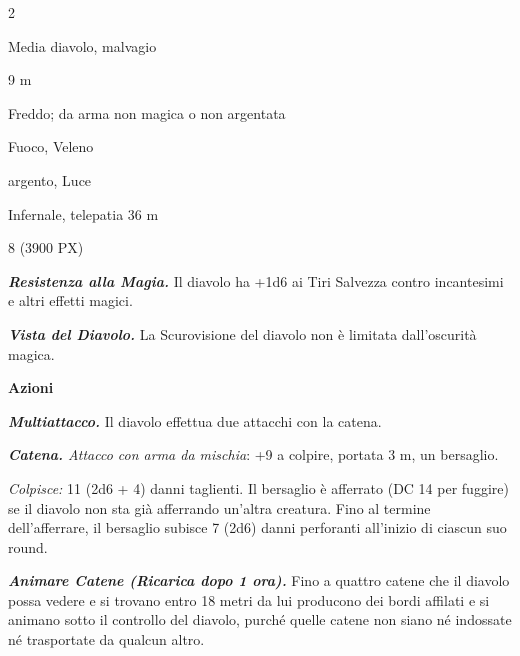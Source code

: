 \begin{multicols}{2}
{
\begin{description}[noitemsep, topsep=0pt, parsep=0pt, partopsep=0pt, itemsep=1pt, leftmargin=2.35cm,  labelwidth=2.2cm, itemindent=0cm, listparindent=0pt] %
\setlength{\baselineskip}{10pt}
\item[\textbf{Taglia/Tipo}] Media diavolo, malvagio
\item[\textbf{Caratt.}] 
\item[\textbf{Punti Ferita}] 
\item[\textbf{Movimento}] 9 m
\item[\textbf{Tiri Salvez.}] 
\item[\textbf{Res. Danni}] Freddo; da arma non magica o non argentata
\item[\textbf{Imm. Danni}] Fuoco, Veleno
\item[\textbf{Vulnerabilità}] argento, Luce
\item[\textbf{Sensi}] 
\item[\textbf{Linguaggi}] Infernale, telepatia 36 m
\item[\textbf{Sfida}] 8 (3900 PX)
\end{description}
\smallskip

\emph{\textbf{Resistenza alla Magia.}} Il diavolo ha +1d6 ai Tiri Salvezza contro incantesimi e altri effetti magici.

\emph{\textbf{Vista del Diavolo.}} La Scurovisione del diavolo non è limitata dall'oscurità magica.

\textbf{Azioni}

\emph{\textbf{Multiattacco.}} Il diavolo effettua due attacchi con la catena.

\emph{\textbf{Catena.} Attacco con arma da mischia}: +9 a colpire, portata 3 m, un bersaglio.

\emph{Colpisce:} 11 (2d6 + 4) danni taglienti. Il bersaglio è afferrato (DC 14 per fuggire) se il diavolo non sta già afferrando un'altra creatura. Fino al termine dell'afferrare, il bersaglio subisce 7 (2d6) danni perforanti all'inizio di ciascun suo round.

\emph{\textbf{Animare Catene (Ricarica dopo 1 ora).}} Fino a quattro catene che il diavolo possa vedere e si trovano entro 18 metri da lui producono dei bordi affilati e si animano sotto il controllo del diavolo, purché quelle catene non siano né indossate né trasportate da qualcun altro.

}
\end{multicols}
